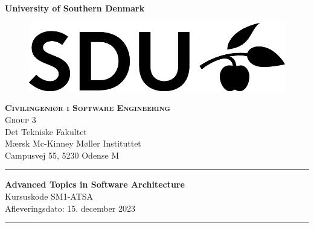 \begin{titlepage}
    \begin{center}
        
        {\Huge \textbf{University of Southern Denmark}}

        \normalsize
        \vspace{0.5 cm}

        \begin{figure}
            \centering
                \includegraphics{Images/sduLogo.png} 
            \label{fig:front:logo}
        \end{figure}
        
        \textsc{\Large \textbf{Civilingeniør i Software Engineering}}\\[0.5cm]
        \textsc{\large  Group 3} \\ Det Tekniske Fakultet \\ Mærsk Mc-Kinney Møller Instituttet \\ Campusvej 55, 5230 Odense M\\[0.5cm] 
        
        \vspace{0.5cm}
        \begin{centering}
        \hrule
        \vspace{.2cm}
         \LARGE \textbf{Advanced Topics in Software Architecture}\\
         \large Kursuskode SM1-ATSA\\
         \large  Afleveringsdato: 15. december 2023
        \vspace{.2cm}
        \hrule
        \end{centering}
        \vspace{1cm}
        

\end{center}
\end{titlepage}
